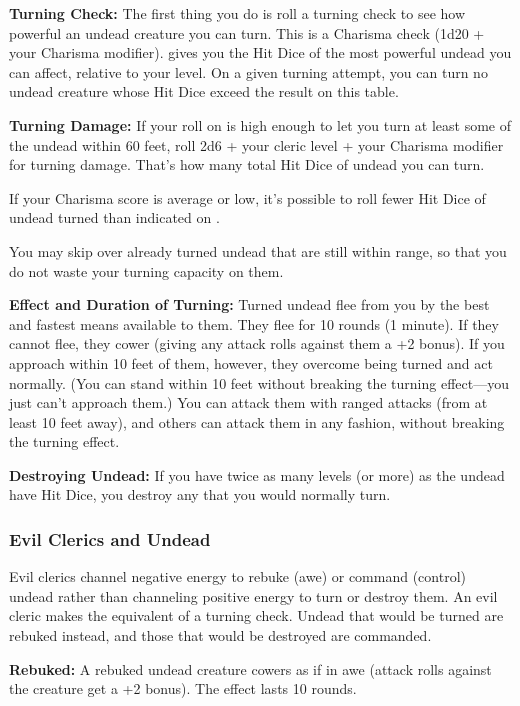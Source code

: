 \textbf{Turning Check:} The first thing you do is roll a turning check to see how powerful an undead creature you can turn. This is a Charisma check (1d20 + your Charisma modifier).  gives you the Hit Dice of the most powerful undead you can affect, relative to your level. On a given turning attempt, you can turn no undead creature whose Hit Dice exceed the result on this table.

\textbf{Turning Damage:} If your roll on  is high enough to let you turn at least some of the undead within 60 feet, roll 2d6 + your cleric level + your Charisma modifier for turning damage. That's how many total Hit Dice of undead you can turn.

If your Charisma score is average or low, it's possible to roll fewer Hit Dice of undead turned than indicated on .

You may skip over already turned undead that are still within range, so that you do not waste your turning capacity on them.

\textbf{Effect and Duration of Turning:} Turned undead flee from you by the best and fastest means available to them. They flee for 10 rounds (1 minute). If they cannot flee, they cower (giving any attack rolls against them a +2 bonus). If you approach within 10 feet of them, however, they overcome being turned and act normally. (You can stand within 10 feet without breaking the turning effect---you just can't approach them.) You can attack them with ranged attacks (from at least 10 feet away), and others can attack them in any fashion, without breaking the turning effect.

\textbf{Destroying Undead:} If you have twice as many levels (or more) as the undead have Hit Dice, you destroy any that you would normally turn.

\subsubsection{Evil Clerics and Undead}
Evil clerics channel negative energy to rebuke (awe) or command (control) undead rather than channeling positive energy to turn or destroy them. An evil cleric makes the equivalent of a turning check. Undead that would be turned are rebuked instead, and those that would be destroyed are commanded.

\textbf{Rebuked:} A rebuked undead creature cowers as if in awe (attack rolls against the creature get a +2 bonus). The effect lasts 10 rounds.

